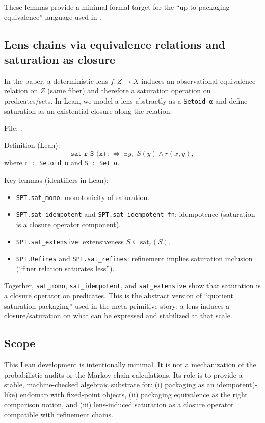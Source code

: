 \documentclass[11pt]{article}
\theoremstyle{definition}
\theoremstyle{remark}
\begin{document}
These lemmas provide a minimal formal target for the ``up to packaging equivalence'' language used in .

\subsection{Lens chains via equivalence relations and saturation as closure}

In the paper, a deterministic lens $f:Z\to X$ induces an observational equivalence relation on $Z$ (same fiber) and therefore a saturation operation on predicates/sets.
In Lean, we model a lens abstractly as a \texttt{Setoid α} and define saturation as an existential closure along the relation.

File: .

Definition (Lean):
\[
\texttt{sat r S (x)} \;:\!\iff\; \exists y,\; S(y) \wedge r(x,y),
\]
where \texttt{r : Setoid α} and \texttt{S : Set α}.

Key lemmas (identifiers in Lean):
\begin{itemize}[leftmargin=*, itemsep=0.25em]
  \item \texttt{SPT.sat\_mono}: monotonicity of saturation.
  \item \texttt{SPT.sat\_idempotent} and \texttt{SPT.sat\_idempotent\_fn}: idempotence (saturation is a closure operator component).
  \item \texttt{SPT.sat\_extensive}: extensiveness $S \subseteq \mathrm{sat}_r(S)$.
  \item \texttt{SPT.Refines} and \texttt{SPT.sat\_refines}: refinement implies saturation inclusion (``finer relation saturates less'').
\end{itemize}

Together, \texttt{sat\_mono}, \texttt{sat\_idempotent}, and \texttt{sat\_extensive} show that saturation is a closure operator on predicates.
This is the abstract version of ``quotient saturation packaging'' used in the meta-primitive story: a lens induces a closure/saturation on what can be expressed and stabilized at that scale.

\subsection{Scope}

This Lean development is intentionally minimal.
It is not a mechanization of the probabilistic audits or the Markov-chain calculations.
Its role is to provide a stable, machine-checked algebraic substrate for:
(i) packaging as an idempotent(-like) endomap with fixed-point objects,
(ii) packaging equivalence as the right comparison notion, and
(iii) lens-induced saturation as a closure operator compatible with refinement chains.
 


\end{document}
